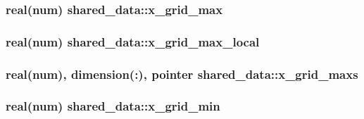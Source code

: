 \subsubsection[{\texorpdfstring{x\+\_\+grid\+\_\+max}{x_grid_max}}]{\setlength{\rightskip}{0pt plus 5cm}real(num) shared\+\_\+data\+::x\+\_\+grid\+\_\+max}\hypertarget{namespaceshared__data_a109ff2adf267448d4110d7618c16ae54}{}\label{namespaceshared__data_a109ff2adf267448d4110d7618c16ae54}
\subsubsection[{\texorpdfstring{x\+\_\+grid\+\_\+max\+\_\+local}{x_grid_max_local}}]{\setlength{\rightskip}{0pt plus 5cm}real(num) shared\+\_\+data\+::x\+\_\+grid\+\_\+max\+\_\+local}\hypertarget{namespaceshared__data_ad2be7fb0274c89536c91025c7db88b50}{}\label{namespaceshared__data_ad2be7fb0274c89536c91025c7db88b50}
\subsubsection[{\texorpdfstring{x\+\_\+grid\+\_\+maxs}{x_grid_maxs}}]{\setlength{\rightskip}{0pt plus 5cm}real(num), dimension(\+:), pointer shared\+\_\+data\+::x\+\_\+grid\+\_\+maxs}\hypertarget{namespaceshared__data_a486820ed6ed463bc8084e37890eb105e}{}\label{namespaceshared__data_a486820ed6ed463bc8084e37890eb105e}
\subsubsection[{\texorpdfstring{x\+\_\+grid\+\_\+min}{x_grid_min}}]{\setlength{\rightskip}{0pt plus 5cm}real(num) shared\+\_\+data\+::x\+\_\+grid\+\_\+min}\hypertarget{namespaceshared__data_a76d3dbdf07d1cb5aed88b436a613a6f6}{}\label{namespaceshared__data_a76d3dbdf07d1cb5aed88b436a613a6f6}
